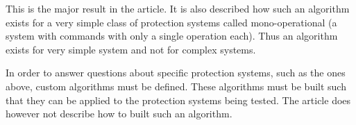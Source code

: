 This is the major result in the article.
It is also described how such an algorithm exists for a very simple class of protection systems called mono-operational (a system with commands with only a single operation each).
Thus an algorithm exists for very simple system and not for complex systems.

In order to answer questions about specific protection systems, such as the ones above, custom algorithms must be defined.
These algorithms must be built such that they can be applied to the protection systems being tested.
The article does however not describe how to built such an algorithm.
